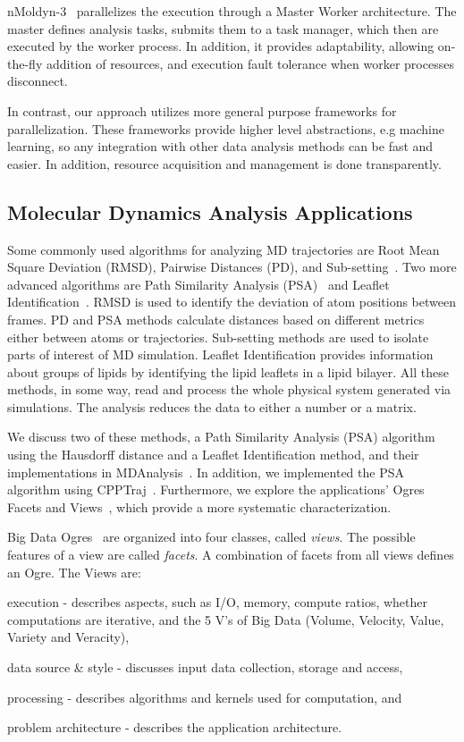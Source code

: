 nMoldyn-3~\cite{hinsen2012nmoldyn} parallelizes the execution through a Master Worker architecture.
The master defines analysis tasks, submits them to a task manager, which then are executed by the worker process.
In addition, it provides adaptability, allowing on-the-fly addition of resources, and execution fault tolerance when worker processes disconnect.

In contrast, our approach utilizes more general purpose frameworks for parallelization.
These frameworks provide higher level abstractions, e.g machine learning, so any  integration with other data analysis methods can be fast and easier.
In addition,  resource acquisition and management is done transparently.

\subsection{Molecular Dynamics Analysis Applications}
\label{use_cases}
Some commonly used algorithms for analyzing MD trajectories are Root Mean Square Deviation (RMSD), Pairwise Distances (PD), and Sub-setting~\cite{mura2014biomolecules}.
Two more advanced algorithms are Path Similarity Analysis (PSA)~\cite{seyler2015path} and Leaflet Identification~\cite{michaud2011mdanalysis}.
RMSD is used to identify the deviation of atom positions between frames.
PD and PSA methods calculate distances based on different metrics either between atoms or trajectories.
Sub-setting methods are used to isolate parts of interest of MD simulation.
Leaflet Identification provides information about groups of lipids by identifying the lipid leaflets in a lipid bilayer.
All these methods, in some way, read and process the whole physical system generated via simulations.
The analysis reduces the data to either a number or a matrix.

We discuss two of these methods, a Path Similarity Analysis (PSA) algorithm using the Hausdorff distance and a Leaflet Identification method, and their implementations in MDAnalysis~\cite{michaud2011mdanalysis,gowers2016mdanalysis}.
In addition, we implemented the PSA algorithm using CPPTraj~\cite{roe2013ptraj}.
Furthermore, we explore the applications' Ogres Facets and Views~\cite{fox2014towards}, which provide a more systematic characterization.

Big Data Ogres~\cite{fox2014towards} are organized into four classes, called \emph{views}. 
The possible features of a view are called \emph{facets}.
A combination of facets from all views defines an Ogre.
The Views are: 
\begin{inparaenum}[1)]
    \item execution - describes aspects, such as I/O, memory, compute ratios, whether computations are iterative, and the 5 V's of Big Data (Volume, Velocity, Value, Variety and Veracity),
    \item data source \& style - discusses input data collection, storage and access,
    \item processing - describes algorithms and kernels used for computation, and
    \item problem architecture - describes the application architecture.
\end{inparaenum}


